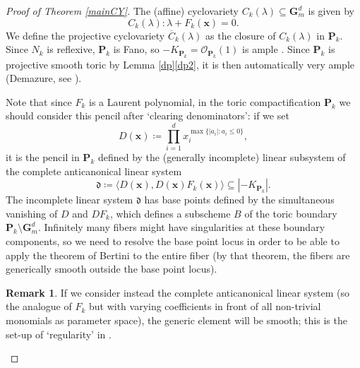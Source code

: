\documentclass[12pt,reqno]{amsart}
\theoremstyle{definition}
\theoremstyle{plain}
\theoremstyle{definition}
\newtheorem{remark}[theorem]{Remark}
\newcommand{\PP}{\mathbf{P}}
\newcommand{\Gm}{\mathbf{G}_m}
\renewcommand{\leq}{\leqslant}
\begin{document}
\begin{proof}[Proof of Theorem \ref{mainCY}] The (affine) cyclovariety $C_k(\lambda) \subseteq \Gm^d$ is given by 
$$ C_k(\lambda) \colon \lambda + F_k(\mathbf x) = 0. $$
We define the projective cyclovariety $\overline C_k(\lambda)$ as the closure of 
$ C_k(\lambda)$ in $\PP_k$. Since $N_k$ is reflexive, $\PP_k$ is Fano, so $-K_{\PP_k}=\mathcal O_{\PP_k}(1)$ is ample \cite[Thm.\ 4.1.9]{Batyrev}. Since $\PP_k$ is projective smooth toric  by Lemma \ref{dp}\eqref{dp2}, it is then automatically very ample (Demazure, see \cite[Cor.\ 2.15]{Oda}).

Note that since $F_k$ is a Laurent polynomial, in the toric compactification $\PP_k$ we should consider this pencil after `clearing denominators': if we set $$D(\mathbf x) \coloneqq  \prod_{i=1}^d x_i^{\max \{|a_i| \colon a_i \leq 0\}}, $$ it is the pencil in $\PP_k$ defined by the (generally incomplete) linear subsystem of the complete anticanonical linear system 
$$ \mathfrak d  \coloneqq  \langle D(\mathbf x), D(\mathbf x) F_k(\mathbf x) \rangle \subseteq |-K_{\PP_k}|. $$
 The incomplete linear system $\mathfrak d$ has base points defined by the simultaneous vanishing of $D$ and $DF_k$, which defines a subscheme $B$ of the toric boundary $\PP_k \setminus \Gm^d$. Infinitely many fibers might have singularities at these boundary components, so we need to resolve the base point locus in order to be able to apply the theorem of Bertini to the entire fiber (by that theorem, the fibers are generically smooth outside the base point locus). 

\begin{remark} 
If we consider instead the complete anticanonical linear system (so the analogue of $F_k$ but with varying coefficients in front of all non-trivial monomials as parameter space), the generic element will be smooth; this is the set-up of `regularity' in \cite{Batyrev}. 
\end{remark}




\end{proof}
\end{document}
